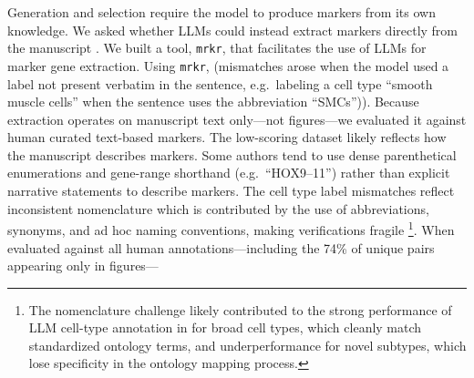 \documentclass[10pt,twocolumn]{article}
\theoremstyle{plain}
\theoremstyle{definition}
\theoremstyle{remark}
\begin{document}
Generation and selection require the model to produce markers from its own knowledge. We asked whether LLMs could instead extract markers directly from the manuscript \citep{Booeshaghi_2026}. We built a tool, \texttt{mrkr}, that facilitates the use of LLMs for marker gene extraction. Using \texttt{mrkr},  (mismatches arose when the model used a label not present verbatim in the sentence, e.g.\ labeling a cell type ``smooth muscle cells'' when the sentence uses the abbreviation ``SMCs'')). Because extraction operates on manuscript text only---not figures---we evaluated it against human curated text-based markers.  The low-scoring dataset likely reflects how the manuscript describes markers. Some authors tend to use dense parenthetical enumerations and gene-range shorthand (e.g.\ ``HOX9--11'') rather than explicit narrative statements to describe markers. The cell type label mismatches reflect inconsistent nomenclature which is contributed by the use of abbreviations, synonyms, and ad hoc naming conventions, making verifications fragile \citep{Booeshaghi_2026} \footnote{The nomenclature challenge likely contributed to the strong performance of LLM cell-type annotation in \citep{Xiao_2025} for broad cell types, which cleanly match standardized ontology terms, and underperformance for novel subtypes, which lose specificity in the ontology mapping process.}. When evaluated against all human annotations---including the 74\% of unique pairs appearing only in figures---
\end{document}
